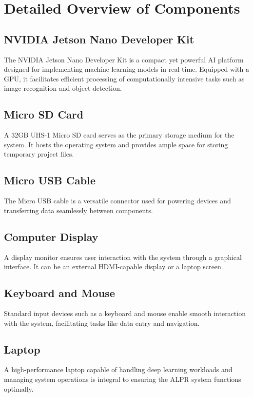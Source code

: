 \section{Detailed Overview of Components}

\subsection{NVIDIA Jetson Nano Developer Kit}
The NVIDIA Jetson Nano Developer Kit is a compact yet powerful AI platform designed for implementing machine learning models in real-time. Equipped with a GPU, it facilitates efficient processing of computationally intensive tasks such as image recognition and object detection.

\subsection{Micro SD Card}
A 32GB UHS-1 Micro SD card serves as the primary storage medium for the system. It hosts the operating system and provides ample space for storing temporary project files.

\subsection{Micro USB Cable}
The Micro USB cable is a versatile connector used for powering devices and transferring data seamlessly between components.

\subsection{Computer Display}
A display monitor ensures user interaction with the system through a graphical interface. It can be an external HDMI-capable display or a laptop screen.

\subsection{Keyboard and Mouse}
Standard input devices such as a keyboard and mouse enable smooth interaction with the system, facilitating tasks like data entry and navigation.

\subsection{Laptop}
A high-performance laptop capable of handling deep learning workloads and managing system operations is integral to ensuring the ALPR system functions optimally.

